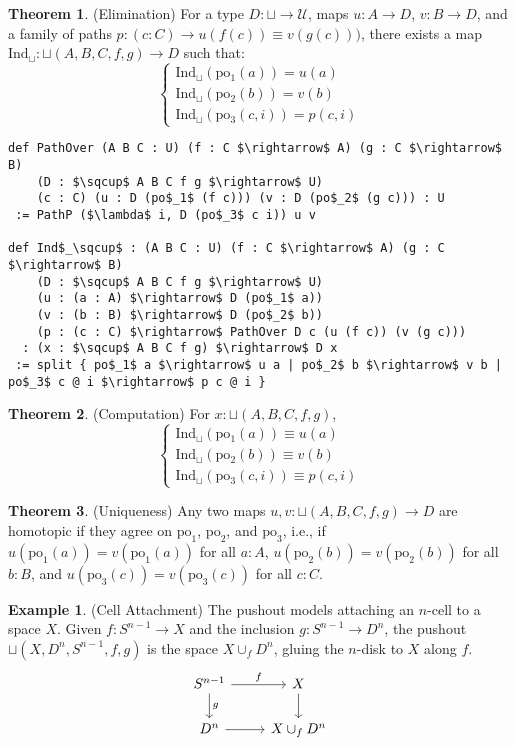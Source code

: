 \documentclass{article}
\theoremstyle{definition}
\newtheorem{theorem}{Theorem}
\newtheorem{example}{Example}
\begin{document}
\begin{theorem} (Elimination)
For a type $D : \sqcup \to \mathcal{U}$, maps $u : A \to D$, $v : B \to D$,
and a family of paths $p : (c : C) \to u(f(c)) \equiv v(g(c)))$,
there exists a map $\text{Ind}_\sqcup : \sqcup(A,B,C,f,g) \to D$ such that:
\[
\begin{cases}
\text{Ind}_\sqcup(\text{po$_1$}(a)) = u(a) \\
\text{Ind}_\sqcup(\text{po$_2$}(b)) = v(b) \\
\text{Ind}_\sqcup(\text{po$_3$}(c,i)) = p(c,i)
\end{cases}
\]
\begin{lstlisting}[mathescape=true]
def PathOver (A B C : U) (f : C $\rightarrow$ A) (g : C $\rightarrow$ B)
    (D : $\sqcup$ A B C f g $\rightarrow$ U)
    (c : C) (u : D (po$_1$ (f c))) (v : D (po$_2$ (g c))) : U
 := PathP ($\lambda$ i, D (po$_3$ c i)) u v

def Ind$_\sqcup$ : (A B C : U) (f : C $\rightarrow$ A) (g : C $\rightarrow$ B)
    (D : $\sqcup$ A B C f g $\rightarrow$ U)
    (u : (a : A) $\rightarrow$ D (po$_1$ a))
    (v : (b : B) $\rightarrow$ D (po$_2$ b))
    (p : (c : C) $\rightarrow$ PathOver D c (u (f c)) (v (g c)))
  : (x : $\sqcup$ A B C f g) $\rightarrow$ D x
 := split { po$_1$ a $\rightarrow$ u a | po$_2$ b $\rightarrow$ v b | po$_3$ c @ i $\rightarrow$ p c @ i }
\end{lstlisting}
\end{theorem}

\newpage
\begin{theorem} (Computation)
For $x : \sqcup(A,B,C,f,g)$,
\[
\begin{cases}
\text{Ind$_\sqcup$}(\text{po$_1$}(a)) \equiv u(a) \\
\text{Ind$_\sqcup$}(\text{po$_2$}(b)) \equiv v(b) \\
\text{Ind$_\sqcup$}(\text{po$_3$}(c,i)) \equiv p(c,i)
\end{cases}
\]
\end{theorem}

\begin{theorem} (Uniqueness)
Any two maps $u, v : \sqcup(A,B,C,f,g) \to D$ are homotopic
if they agree on $\text{po}_1$, $\text{po}_2$, and $\text{po}_3$, i.e.,
if $u(\text{po}_1(a)) = v(\text{po}_1(a))$ for all $a : A$, $u(\text{po}_2(b)) = v(\text{po}_2(b))$
for all $b : B$, and $u(\text{po}_3(c)) = v(\text{po}_3(c))$ for all $c : C$.
\end{theorem}

\begin{example} (Cell Attachment)
The pushout models attaching an $n$-cell to a space $X$.
Given $f : S^{n-1} \to X$ and the inclusion $g : S^{n-1} \to D^n$,
the pushout $\sqcup(X,D^n,S^{n-1},f,g)$ is the
space $X \cup_f D^n$, gluing the $n$-disk to $X$ along $f$.
\[
\begin{tikzcd}
S^{n-1} \arrow[r, "f"] \arrow[d, "g"] & X \arrow[d] \\
D^n \arrow[r] & X \cup_f D^n
\end{tikzcd}
\]
\end{example}
\end{document}
